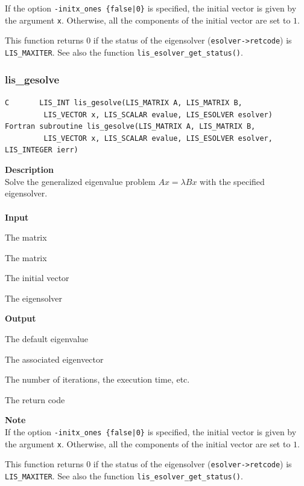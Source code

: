 \documentclass[a4paper]{article}
\newcommand{\namelistlabel}[1]{\mbox{#1}\hfill}
\newenvironment{namelist}[1]{%
\begin{list}{}
  {\let\makelabel\namelistlabel
  \settowidth{\labelwidth}{#1}
  \setlength{\leftmargin}{1.1\labelwidth}}
  }{%
\end{list}}
\begin{document}
If the option {\tt -initx\_ones \{false|0\}} is specified, the initial
vector is given by the argument {\tt x}.
Otherwise, all the components of the initial vector are set to $1$. 

This function returns 0 if the status of the eigensolver ({\tt esolver->retcode})
is {\tt LIS\_MAXITER}. See also the function
{\tt lis\_esolver\_get\_status()}. 

\newpage
\subsubsection{lis\_gesolve}
\begin{screen}
\verb|C       LIS_INT lis_gesolve(LIS_MATRIX A, LIS_MATRIX B,|\\ 
\verb|         LIS_VECTOR x, LIS_SCALAR evalue, LIS_ESOLVER esolver)|\\
\verb|Fortran subroutine lis_gesolve(LIS_MATRIX A, LIS_MATRIX B,|\\
\verb|         LIS_VECTOR x, LIS_SCALAR evalue, LIS_ESOLVER esolver, LIS_INTEGER ierr)|
\end{screen}
{\bf Description}\\
\indent
Solve the generalized eigenvalue problem $Ax = \lambda Bx$ with the specified eigensolver.
\\ \\
\noindent
{\bf Input}
\begin{namelist}{XXXXXXXXXXXXXXXXXXXX}
\item[\tt A] The matrix
\item[\tt B] The matrix  
\item[\tt x] The initial vector
\item[\tt esolver] The eigensolver
\end{namelist}
{\bf Output}
\begin{namelist}{XXXXXXXXXXXXXXXXXXXX}
\item[\tt evalue] The default eigenvalue
\item[\tt x] The associated eigenvector
\item[\tt esolver] The number of iterations, the execution time, etc.
\item[\tt ierr] The return code
\end{namelist}
{\bf Note}\\
\indent
If the option {\tt -initx\_ones \{false|0\}} is specified, the initial
vector is given by the argument {\tt x}.
Otherwise, all the components of the initial vector are set to $1$. 

This function returns 0 if the status of the eigensolver ({\tt esolver->retcode})
is {\tt LIS\_MAXITER}. See also the function
{\tt lis\_esolver\_get\_status()}. 
\end{document}
